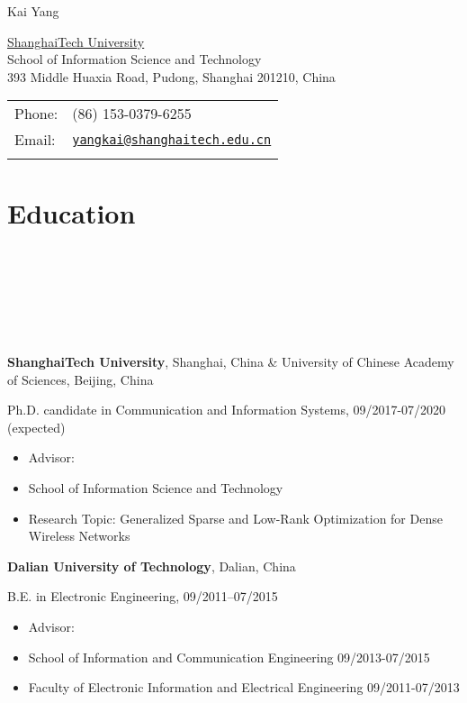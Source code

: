 \documentclass{article}
\def\name{Kai Yang}
\newcommand{\homepage}[3][homepagecolor]{\href{#2}{\color{#1}{#3}}}
\begin{document}
{\huge \name}


\vspace{0.2in}

\begin{minipage}{0.55\linewidth}
  \href{http://www.shanghaitech.edu.cn}{ShanghaiTech University} \\
  School of Information Science and Technology \\
393 Middle Huaxia Road, Pudong, Shanghai 201210, China
\end{minipage}\hspace{2em}
\begin{minipage}{0.45\linewidth}
  \begin{tabular}{ll}
    Phone: & (86) 153-0379-6255 \\
    Email: & \href{mailto:yangkai@shanghaitech.edu.cn}{\tt yangkai@shanghaitech.edu.cn} \\ &\\
  \end{tabular}
\end{minipage}


\section*{\colorbox{mygrey}{Education~~~~~~~~~~~~~~~~~~~~~~~~~~~~~~~~~~~~~~~~~~~~~~~~~~~~~~~~~~~~~~~~~~~~~~~~~~~~~~~~~~~~~~~~~~~}}
{\bf{ShanghaiTech University}}, Shanghai, China \& University of Chinese Academy of Sciences, Beijing, China

Ph.D. candidate in Communication and Information Systems, 09/2017-07/2020 (expected) 
\begin{itemize}
  \item Advisor: \homepage{http://shiyuanming.github.io/}{Prof. Yuanming Shi}
  \item School of Information Science and Technology
  \item Research Topic: {{Generalized Sparse and Low-Rank Optimization for Dense Wireless Networks}}
\end{itemize}

{\bf{Dalian University of Technology}}, Dalian, China

B.E. in Electronic Engineering, 09/2011--07/2015
\begin{itemize}
\item Advisor: \homepage{http://faculty.dlut.edu.cn/GuoYanqing}{Prof. Yanqing Guo}
\item School of Information and Communication Engineering 09/2013-07/2015
\item Faculty of Electronic Information and Electrical Engineering 09/2011-07/2013
\end{itemize}
\end{document}
